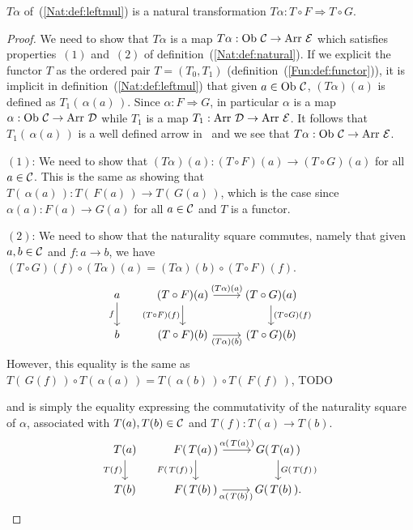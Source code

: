 \begin{prop}\label{Nat:prop:leftmul}
    $T\alpha$ of~(\ref{Nat:def:leftmul}) is a natural transformation 
    $T\alpha:T\circ F\Rightarrow T\circ G$.
\end{prop}
\begin{proof}
    We need to show that $T\alpha$ is a map $T\alpha : \ob\ \Cat\to\arr\ \Eat$
    which satisfies properties~$(1)$ and~$(2)$ of 
    definition~(\ref{Nat:def:natural}). If we explicit the functor $T$ as the 
    ordered pair $T=(T_{0},T_{1})$ (definition~(\ref{Fun:def:functor})), it is
    implicit in definition~(\ref{Nat:def:leftmul}) that given $a\in\mbox{\rm Ob}\ \mbox{$\cal C$}$,
    $(T\alpha)(a)$ is defined as $T_{1}(\,\alpha(a)\,)$. Since 
    $\alpha:F\Rightarrow G$, in particular $\alpha$ is a map $\alpha:\mbox{\rm Ob}\ \mbox{$\cal C$}
    \to\mbox{\rm Arr}\ \mbox{$\cal D$}$ while $T_{1}$ is a map $T_{1}:\arr\ \Dat\to\arr\ \Eat$. It 
    follows that $T_{1}(\,\alpha(a)\,)$ is a well defined arrow in \Eat\ and we
    see that $T\alpha:\ob\ \Cat\to\arr\ \Eat$.

    $(1)$: We need to show that $(T\alpha)(a): (T\circ F)(a) \to (T\circ G)(a)$
    for all $a\in\mbox{$\cal C$}$. This is the same as showing that $T(\,\alpha(a)\,) :
    T(\,F(a)\,)\to T(\,G(a)\,)$, which is the case since $\alpha(a):F(a)\to G(a)$ 
    for all $a\in\mbox{$\cal C$}$ and $T$ is a functor.

    $(2)$: We need to show that the naturality square commutes, namely that
    given $a,b\in\mbox{$\cal C$}$ and $f:a\to b$, we have $(T\circ G)(f)\circ(T\alpha)(a)
    =(T\alpha)(b)\circ(T\circ F)(f)$.
    \[
        \begin{tikzcd}
            a\arrow[d,swap, "f"]
            &(T\circ F)(a)\arrow[r, "(T\alpha)(a)"]\arrow[d, swap,"(T\circ F)(f)"]
            &(T\circ G)(a)\arrow[d, "(T\circ G)(f)"]
            \\
            b
            &(T\circ F)(b)\arrow[r, swap, "(T\alpha)(b)"]
            &(T\circ G)(b)
        \end{tikzcd}
    \]
    However, this equality is the same as $T(\,G(f)\,)\circ T(\,\alpha(a)\,)
    =T(\,\alpha(b)\,)\circ T(\,F(f)\,)$, 
    TODO 
    
    and is simply the equality expressing
    the commutativity of the naturality square of $\alpha$, associated with 
    $T(a),T(b)\in\mbox{$\cal C$}$ and $T(f):T(a)\to T(b)$.
    \[
        \begin{tikzcd}
            T(a)\arrow[d,swap, "T(f)"]
            &F(\,T(a)\,)\arrow[r, "\alpha(\,T(a)\,)"]\arrow[d, swap,"F(\,T(f)\,)"]
            &G(\,T(a)\,)\arrow[d, "G(\,T(f)\,)"]
            \\
            T(b)
            &F(\,T(b)\,)\arrow[r, swap, "\alpha(\,T(b)\,)"]
            &G(\,T(b)\,).
        \end{tikzcd}
    \]
\end{proof}
